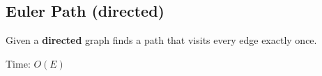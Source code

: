 \subsection{Euler Path (directed)}
Given a \textbf{directed} graph finds a path that visits every edge exactly once.

Time: $O(E)$
